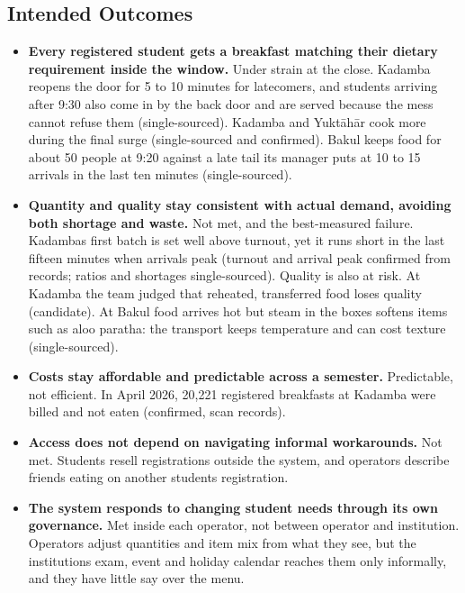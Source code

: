 \documentclass[
  10pt,
  table]{article}
\providecommand{\tightlist}{%
  \setlength{\itemsep}{0pt}\setlength{\parskip}{0pt}}
\renewcommand{\tightlist}{\setlength{\itemsep}{1.5pt}\setlength{\parskip}{0pt}}
\begin{document}
\subsection{Intended Outcomes}\label{intended-outcomes}

\begin{itemize}
\tightlist
\item
  \textbf{Every registered student gets a breakfast matching their dietary requirement inside the window.} Under strain at the close. Kadamba reopens the door for 5 to 10 minutes for latecomers, and students arriving after 9:30 also come in by the back door and are served because the mess cannot refuse them (single-sourced). Kadamba and Yuktāhār cook more during the final surge (single-sourced and confirmed). Bakul keeps food for about 50 people at 9:20 against a late tail its manager puts at 10 to 15 arrivals in the last ten minutes (single-sourced).
\item
  \textbf{Quantity and quality stay consistent with actual demand, avoiding both shortage and waste.} Not met, and the best-measured failure. Kadamba\textquotesingle s first batch is set well above turnout, yet it runs short in the last fifteen minutes when arrivals peak (turnout and arrival peak confirmed from records; ratios and shortages single-sourced). Quality is also at risk. At Kadamba the team judged that reheated, transferred food loses quality (candidate). At Bakul food arrives hot but steam in the boxes softens items such as aloo paratha: the transport keeps temperature and can cost texture (single-sourced).
\item
  \textbf{Costs stay affordable and predictable across a semester.} Predictable, not efficient. In April 2026, 20,221 registered breakfasts at Kadamba were billed and not eaten (confirmed, scan records).
\item
  \textbf{Access does not depend on navigating informal workarounds.} Not met. Students resell registrations outside the system, and operators describe friends eating on another student\textquotesingle s registration.
\item
  \textbf{The system responds to changing student needs through its own governance.} Met inside each operator, not between operator and institution. Operators adjust quantities and item mix from what they see, but the institution\textquotesingle s exam, event and holiday calendar reaches them only informally, and they have little say over the menu.
\end{itemize}
\end{document}
